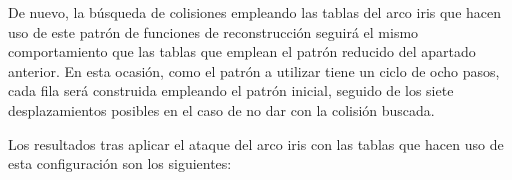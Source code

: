 \documentclass[12pt,spanish,listoffigures,listoftables,listofalgorithms]{tfgetsinf}
\begin{document}
De nuevo, la búsqueda de colisiones empleando las tablas del arco iris que hacen uso de este patrón de funciones de reconstrucción seguirá el mismo comportamiento que las tablas que emplean el patrón reducido del apartado anterior. En esta ocasión, como el patrón a utilizar tiene un ciclo de ocho pasos, cada fila será construida empleando el patrón inicial, seguido de los siete desplazamientos posibles en el caso de no dar con la colisión buscada.

Los resultados tras aplicar el ataque del arco iris con las tablas que hacen uso de esta configuración son los siguientes:

\def\arraystretch{1.5}
\begin{table}[H]
	\LARGE
	\centering
	\caption{Porcentajes de éxito para las tablas empleando el patrón extenso}
	\label{resPG}
\end{table}
\end{document}
